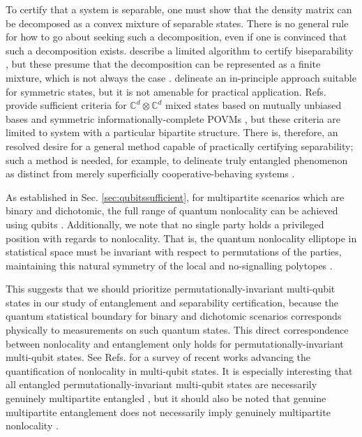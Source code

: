 \documentclass[
  12pt          %
  ,letterpaper  %
  ,center       %
  ,noupper      %
  ,english,fleqn]{uconnthesis}
\begin{document}
To certify that a system is separable, one must show that the density matrix can be decomposed as a convex mixture of separable states. There is no general rule for how to go about seeking such a decomposition, even if one is convinced that such a decomposition exists.  \citet{KrausCiracKarnasLewenstein2000,KarnasLewenstein2001} describe a limited algorithm to certify biseparability \cite{Szalay2012Partial}, but these presume that the decomposition can be represented as a finite mixture, which is not always the case \cite{SuperradSeparable}. \citet{CiracSpinSqueezing} delineate an in-principle approach suitable for symmetric states, but it is not amenable for practical application. Refs. \cite{BipartiteMUBEntanglement,BipartiteSICEntanglement} provide sufficient criteria for \(\mathbb{C}^d\otimes \mathbb{C}^d\) mixed states based on mutually unbiased bases \cite{MUBConstruction,MUBReview,MUBSICPOVM} and symmetric informationally-complete POVMs \cite{SICPOVM2002,SICPOVM2004}, but these criteria are limited to system with a particular bipartite structure. There is, therefore, an resolved desire for a general method capable of practically certifying separability; such a method is needed, for example, to delineate truly entangled phenomenon as distinct from merely superficially cooperative-behaving systems \cite{eckert2002quantum,SuperradSeparable,MacroscropicQuantumness,MacroscopicArXiv}.

As established in Sec. \ref{sec:qubitssufficient}, for multipartite scenarios which are binary and dichotomic, the full range of quantum nonlocality can be achieved using qubits \cite{MasanesQubits}. Additionally, we note that no single party holds a privileged position with regards to nonlocality. That is, the quantum nonlocality \gls{elliptope} in statistical space must be invariant with respect to permutations of the parties, maintaining this natural symmetry of the local and no-signalling \glspl{polytope} \cite{GisinFramework2012,roberts_thesis,WernerWolfQB,WehnerQB,ScaraniNotes,*ScaraniNotes2}. 

This suggests that we should prioritize permutationally-invariant multi-qubit states in our study of entanglement and separability certification, because the quantum statistical boundary for binary and dichotomic scenarios corresponds physically to measurements on such quantum states. This direct correspondence between nonlocality and entanglement only holds for permutationally-invariant multi-qubit states. See Refs. \cite{WernerWolfQB,GivenQB.NQubit,AcinDetecting} for a survey of recent works advancing the quantification of nonlocality in multi-qubit states. It is especially interesting that all entangled permutationally-invariant multi-qubit states are necessarily genuinely multipartite entangled \cite{pptNqubit}, but it should also be noted that genuine multipartite entanglement does not necessarily imply genuinely multipartite nonlocality \cite{EntanglementInequivalent2014}. 
\end{document}

